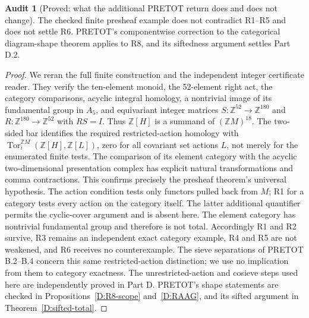 \documentclass[11pt,a4paper]{article}
\newcommand{\Z}{\mathbb Z}
\newcommand{\Tor}{\operatorname{Tor}}
\theoremstyle{definition}
\newtheorem{audit}[theorem]{Audit}
\begin{document}
\begin{audit}[Proved: what the additional PRETOT return does and does not change]\label{A:PRETOT}
The checked finite presheaf example does not contradict R1--R5 and does not settle R6. PRETOT's componentwise correction to the categorical diagram-shape theorem applies to R8, and its siftedness argument settles Part D.2.
\end{audit}
\begin{proof}
We reran the full finite construction and the independent integer certificate reader. They verify the ten-element monoid, the 52-element right act, the category comparisons, acyclic integral homology, a nontrivial image of its fundamental group in $A_5$, and equivariant integer matrices $S:\Z^{52}\to\Z^{180}$ and $R:\Z^{180}\to\Z^{52}$ with $RS=I$. Thus $\Z[H]$ is a summand of $(\Z M)^{18}$. The two-sided bar identifies the required restricted-action homology with $\Tor^{\Z M}_i(\Z[H],\Z[L])$, zero for all covariant set actions $L$, not merely for the enumerated finite tests. The comparison of its element category with the acyclic two-dimensional presentation complex has explicit natural transformations and comma contractions. This confirms precisely the presheaf theorem's universal hypothesis. The action condition tests only functors pulled back from $M$; R1 for a category tests every action on the category itself. The latter additional quantifier permits the cyclic-cover argument and is absent here. The element category has nontrivial fundamental group and therefore is not total. Accordingly R1 and R2 survive, R3 remains an independent exact category example, R4 and R5 are not weakened, and R6 receives no counterexample. The sieve separations of PRETOT B.2--B.4 concern this same restricted-action distinction; we use no implication from them to category exactness. The unrestricted-action and cosieve steps used here are independently proved in Part D. PRETOT's shape statements are checked in Propositions~\ref{D:R8-scope} and~\ref{D:RAAG}, and its sifted argument in Theorem~\ref{D:sifted-total}.
\end{proof}
\end{document}
